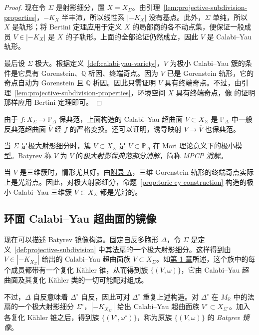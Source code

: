 \begin{proof}
现在令 $\Sigma$ 是射影细分，置 $X=X_\Sigma$。由引理~\ref{lem:projective-subdivision-properties}，$-K_X$ 半丰沛，所以线性系 $|-K_X|$ 没有基点。此外，$\Sigma$ 单纯，所以 $X$ 是轨形；将 Bertini 定理应用于定义 $X$ 的局部商的各不动点集，便保证一般成员 $V\in|-K_X|$ 是 $X$ 的子轨形。上面的全部论证仍然成立，因此 $V$ 是 Calabi--Yau 轨形。

最后设 $\Sigma$ 极大。根据定义~\ref{def:calabi-yau-variety}，$V$ 为极小 Calabi--Yau 簇的条件是它具有 Gorenstein、$\mathbb Q$ 析因、终端奇点。因为 $V$ 已是 Gorenstein 轨形，它的奇点自动为 Gorenstein 且 $\mathbb Q$ 析因。因此只需证明 $V$ 具有终端奇点。不过，由引理~\ref{lem:projective-subdivision-properties}，环境空间 $X$ 具有终端奇点，像  的证明那样应用 Bertini 定理即可。
\end{proof}

由于 $f:X_\Sigma\to\mathbb P_\Delta$ 保典范，上面构造的 Calabi--Yau 超曲面 $V\subset X_\Sigma$ 是 $\mathbb P_\Delta$ 中一般反典范超曲面 $\overline V$ 经 $f$ 的严格变换。还可以证明，诱导映射 $V\to\overline V$ 也保典范。

当 $\Sigma$ 是极大射影细分时，簇 $V\subset X_\Sigma$ 是 $\overline V\subset\mathbb P_\Delta$ 在 Mori 理论意义下的极小模型。Batyrev 称 $V$ 为 $\overline V$ 的\emph{极大射影保典范部分消解}，简称 \emph{MPCP 消解}。

当 $V$ 是三维簇时，情形尤其好。由\hyperref[app:singular-varieties]{附录 A}，三维 Gorenstein 轨形的终端奇点实际上是光滑点。因此，对极大射影细分，命题~\ref{prop:toric-cy-construction} 构造的极小 Calabi--Yau 三维簇 $V\subset X_\Sigma$ 都是光滑的。

\subsection{环面 Calabi--Yau 超曲面的镜像}\label{subsec:batyrev-pair}

现在可以描述 Batyrev 镜像构造。固定自反多胞形 $\Delta$，令 $\Sigma$ 是定义~\ref{def:projective-subdivision} 中其法扇的一个极大射影细分。这样得到由 $V\in|-K_{X_\Sigma}|$ 给出的 Calabi--Yau 超曲面族 $V\subset X_\Sigma$。如\hyperref[chap:introduction]{第 1 章}所述，这个族中的每个成员都带有一个复化 Kähler 锥，从而得到族 $\{(V,\omega)\}$，它由 Calabi--Yau 超曲面及其复化 Kähler 类的一切可能配对组成。

不过，$\Delta$ 自反意味着 $\Delta^\circ$ 自反，因此可对 $\Delta^\circ$ 重复上述构造。对 $\Delta^\circ$ 在 $M_{\mathbb R}$ 中的法扇的一个极大射影细分 $\Sigma^\circ$，$|-K_{X_{\Sigma^\circ}}|$ 给出 Calabi--Yau 超曲面族 $V^\circ\subset X_{\Sigma^\circ}$。加入各复化 Kähler 锥之后，得到族 $\{(V^\circ,\omega^\circ)\}$，称为原族 $\{(V,\omega)\}$ 的 \emph{Batyrev 镜像}。

